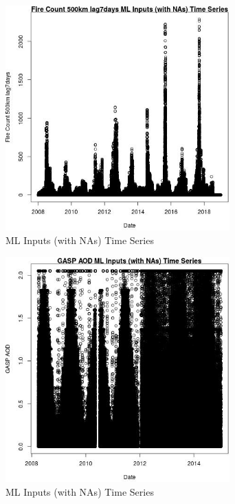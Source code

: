 \begin{figure} 
\centering  
\includegraphics[width=0.77\textwidth]{Code_Outputs/Report_ML_input_PM25_Step4_part_e_de_duplicated_aves_compiled_2019-05-21wNAs_Fire_Count_500km_lag7daysvDate.jpg} 
\caption{\label{fig:Report_ML_input_PM25_Step4_part_e_de_duplicated_aves_compiled_2019-05-21wNAsFire_Count_500km_lag7daysvDate}ML Inputs (with NAs) Time Series} 
\end{figure} 
 

\clearpage 

\begin{figure} 
\centering  
\includegraphics[width=0.77\textwidth]{Code_Outputs/Report_ML_input_PM25_Step4_part_e_de_duplicated_aves_compiled_2019-05-21wNAs_GASP_AODvDate.jpg} 
\caption{\label{fig:Report_ML_input_PM25_Step4_part_e_de_duplicated_aves_compiled_2019-05-21wNAsGASP_AODvDate}ML Inputs (with NAs) Time Series} 
\end{figure} 
 

